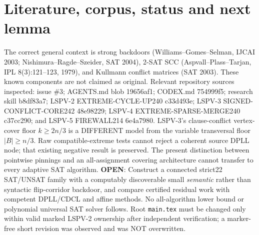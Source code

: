 \documentclass[10pt]{article}
\begin{document}
\section{Literature, corpus, status and next lemma}
The correct general context is strong backdoors (Williams--Gomes--Selman, IJCAI 2003; Nishimura--Ragde--Szeider, SAT 2004), 2-SAT SCC (Aspvall--Plass--Tarjan, IPL 8(3):121--123, 1979), and Kullmann conflict matrices (SAT 2003). These known components are not claimed as original. Relevant repository sources inspected: issue \#3; AGENTS.md blob 19656af1; CODEX.md 754999f5; research skill b8df83a7; LSPV-2 EXTREME-CYCLE-UP240 c33d493e; LSPV-3 SIGNED-CONFLICT-CORE242 48e98229; LSPV-4 EXTREME-SPARSE-MERGE240 c37cc290; and LSPV-5 FIREWALL214 6e4a7980. LSPV-3's clause-conflict vertex-cover floor $k\ge2n/3$ is a DIFFERENT model from the variable transversal floor $|B|\ge n/3$. Raw compatible-extreme tests cannot reject a coherent source DPLL node; that existing negative result is preserved. The present distinction between pointwise pinnings and an all-assignment covering architecture cannot transfer to every adaptive SAT algorithm.
\textbf{OPEN}: Construct a connected strict22 SAT/UNSAT family with a computably discoverable small \emph{semantic} rather than syntactic flip-corridor backdoor, and compare certified residual work with competent DPLL/CDCL and affine methods. No all-algorithm lower bound or polynomial universal SAT solver follows. Root \texttt{main.tex} must be changed only within valid marked LSPV-2 ownership after independent verification; a marker-free short revision was observed and was NOT overwritten. 
\end{document}
